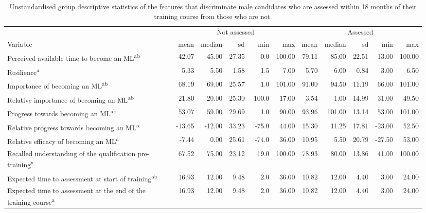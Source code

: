 \documentclass[
  12pt,
  a4paper,
]{book}
\begin{document}
\begin{landscape}\begin{table}[!h]

\caption{\label{tab:male-GTA-18m-combined-summary-stats}Unstandardised group descriptive statistics of the features that discriminate male candidates who are assessed within 18 months of their training course from those who are not.}
\centering
\begin{tabular}[t]{>{\raggedright\arraybackslash}p{9cm}rrrrrrrrrr}
\toprule
\multicolumn{1}{c}{ } & \multicolumn{5}{c}{Not assessed} & \multicolumn{5}{c}{Assessed} \\
\cmidrule(l{3pt}r{3pt}){2-6} \cmidrule(l{3pt}r{3pt}){7-11}
Variable & mean & median & sd & min & max & mean & median & sd & min & max\\
\midrule
\rowcolor{gray!6}  Perceived available time to become an ML\textsuperscript{ab} & 42.07 & 45.00 & 27.35 & 0.0 & 100.00 & 79.11 & 85.00 & 22.51 & 13.00 & 100.00\\
Resilience\textsuperscript{a} & 5.33 & 5.50 & 1.58 & 1.5 & 7.00 & 5.70 & 6.00 & 0.84 & 3.00 & 6.50\\
\rowcolor{gray!6}  Importance of becoming an ML\textsuperscript{ab} & 68.19 & 69.00 & 25.57 & 1.0 & 101.00 & 91.00 & 94.50 & 11.19 & 66.00 & 101.00\\
Relative importance of becoming an ML\textsuperscript{ab} & -21.80 & -20.00 & 25.30 & -100.0 & 17.00 & 3.54 & 1.00 & 14.99 & -31.00 & 49.50\\
\rowcolor{gray!6}  Progress towards becoming an ML\textsuperscript{ab} & 53.07 & 59.00 & 29.69 & 1.0 & 90.00 & 93.96 & 101.00 & 13.14 & 53.00 & 101.00\\
\addlinespace
Relative progress towards becoming an ML\textsuperscript{a} & -13.65 & -12.00 & 33.23 & -75.0 & 44.00 & 15.30 & 11.25 & 17.81 & -23.00 & 52.50\\
\rowcolor{gray!6}  Relative efficacy of becoming an ML\textsuperscript{a} & -7.44 & 0.00 & 25.61 & -74.0 & 36.00 & 10.95 & 5.50 & 20.79 & -27.50 & 53.00\\
Recalled understanding of the qualification pre-training\textsuperscript{a} & 67.52 & 75.00 & 23.12 & 19.0 & 100.00 & 78.93 & 80.00 & 13.86 & 41.00 & 100.00\\
\rowcolor{gray!6}  Expected time to assessment at start of training\textsuperscript{ab} & 16.93 & 12.00 & 9.48 & 2.0 & 36.00 & 10.82 & 12.00 & 4.40 & 3.00 & 24.00\\
Expected time to assessment at the end of the training course\textsuperscript{a} & 16.93 & 12.00 & 9.48 & 2.0 & 36.00 & 10.82 & 12.00 & 4.40 & 3.00 & 24.00\\

\end{tabular}
\end{table}
\end{landscape}
\end{document}
